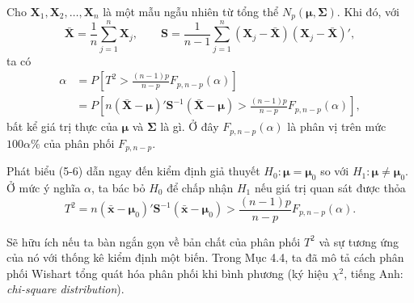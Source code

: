 Cho \(\mathbf{X}_1,\mathbf{X}_2,\ldots,\mathbf{X}_n\) là một mẫu ngẫu nhiên từ
tổng thể \(N_p(\boldsymbol{\mu},\boldsymbol{\Sigma})\). Khi đó, với
\[
  \bar{\mathbf{X}} = \frac{1}{n}\sum_{j=1}^{n}\mathbf{X}_j,
  \qquad
  \mathbf{S}
  = \frac{1}{n-1}\sum_{j=1}^{n}
    (\mathbf{X}_j-\bar{\mathbf{X}})(\mathbf{X}_j-\bar{\mathbf{X}})',
\]
ta có
\begin{equation}
\begin{aligned}
  \alpha
  &= P\left[
    T^2 > \frac{(n-1)p}{n-p}F_{p,n-p}(\alpha)
  \right] \\
  &= P\left[
    n(\bar{\mathbf{X}}-\boldsymbol{\mu})'
    \mathbf{S}^{-1}
    (\bar{\mathbf{X}}-\boldsymbol{\mu})
    > \frac{(n-1)p}{n-p}F_{p,n-p}(\alpha)
  \right],
\end{aligned}
\end{equation}
bất kể giá trị thực của \(\boldsymbol{\mu}\) và \(\boldsymbol{\Sigma}\) là gì. Ở đây
\(F_{p,n-p}(\alpha)\) là phân vị trên mức \(100\alpha\%\) của phân phối
\(F_{p,n-p}\).

Phát biểu (5-6) dẫn ngay đến kiểm định giả thuyết
\(H_0: \boldsymbol{\mu}=\boldsymbol{\mu}_0\) so với
\(H_1: \boldsymbol{\mu}\ne\boldsymbol{\mu}_0\). Ở mức ý nghĩa \(\alpha\), ta bác bỏ
\(H_0\) để chấp nhận \(H_1\) nếu giá trị quan sát được thỏa
\begin{equation}
  T^2
  = n(\bar{\mathbf{x}}-\boldsymbol{\mu}_0)'
    \mathbf{S}^{-1}
    (\bar{\mathbf{x}}-\boldsymbol{\mu}_0)
  > \frac{(n-1)p}{n-p}F_{p,n-p}(\alpha).
\end{equation}

Sẽ hữu ích nếu ta bàn ngắn gọn về bản chất của phân phối \(T^2\) và sự tương ứng
của nó với thống kê kiểm định một biến. Trong Mục 4.4, ta đã mô tả cách phân phối
Wishart tổng quát hóa phân phối khi bình phương (ký hiệu \(\chi^2\), tiếng Anh: \textit{chi-square distribution}).

